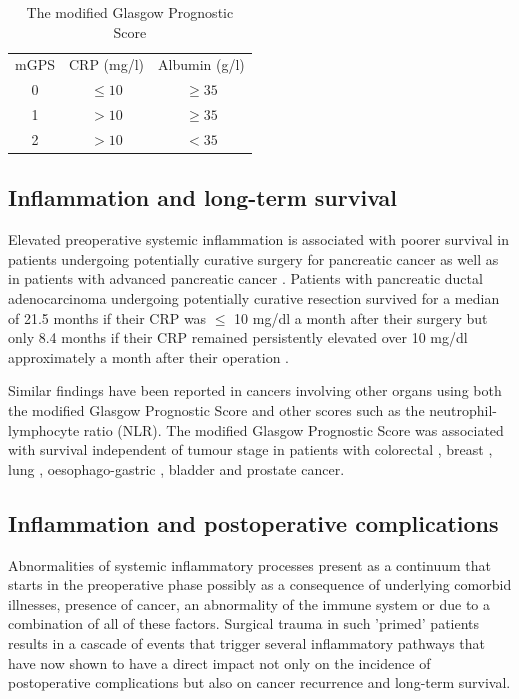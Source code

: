\begin{table}[h]
	\centering
	\caption{The modified Glasgow Prognostic Score}
	\label{table:mGPS}
	\renewcommand{\arraystretch}{1.5} %
	\setlength{\tabcolsep}{12pt} %
	\begin{tabular}{|ccc|}
		\hline
		mGPS & CRP (mg/l) & Albumin (g/l) \\
		 0   & $\leq 10$  & $\geq 35$     \\
		 1   & $> 10$     & $\geq 35$     \\
		 2   & $> 10$     & $< 35$        \\ \hline
	\end{tabular}
\end{table}

\subsection{Inflammation and long-term survival}
Elevated preoperative systemic inflammation is associated with poorer survival in patients undergoing potentially curative surgery for pancreatic cancer \parencite{jamieson_systemic_2005, clark_preoperative_2007, bhatti_preoperative_2010} as well as in patients with advanced pancreatic cancer \parencite{glen_evaluation_2006}. 
Patients with pancreatic ductal adenocarcinoma undergoing potentially curative resection survived for a median of 21.5 months if their CRP was $\leq$ 10 mg/dl a month after their surgery but only 8.4 months if their CRP remained persistently elevated over 10 mg/dl approximately a month after their operation \parencite{jamieson_systemic_2005}. 

Similar findings have been reported in cancers involving other organs using both the modified Glasgow Prognostic Score and other scores such as the neutrophil-lymphocyte ratio (NLR). 
The modified Glasgow Prognostic Score was associated with survival independent of tumour stage in patients with colorectal \parencite{mcmillan_evaluation_2007, leitch_comparison_2007}, breast \parencite{al_murri_evaluation_2006, al_murri_evaluation_2007}, lung \parencite{forrest_comparison_2004}, oesophago-gastric \parencite{crumley_elevated_2006}, bladder \parencite{hilmy_relationship_2006} and prostate \parencite{mcardle_systemic_2006} cancer.


\subsection{Inflammation and postoperative complications}
Abnormalities of systemic inflammatory processes present as a continuum that starts in the preoperative phase possibly as a consequence of underlying comorbid illnesses, presence of cancer, an abnormality of the immune system or due to a combination of all of these factors. 
Surgical trauma in such 'primed' patients results in a cascade of events that trigger several inflammatory pathways that have now shown to have a direct impact not only on the incidence of postoperative complications but also on cancer recurrence and long-term survival.

